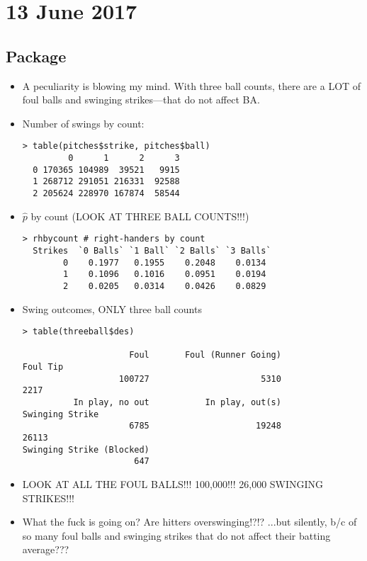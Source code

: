 \documentclass{article}
\begin{document}
\section*{13 June 2017}
\subsection*{Package}
\begin{itemize}
\item A peculiarity is blowing my mind. With three ball counts, there are a LOT of foul balls and swinging strikes---that do not affect BA.
\item Number of swings by count:
\begin{verbatim}
> table(pitches$strike, pitches$ball)
         0      1      2      3
  0 170365 104989  39521   9915
  1 268712 291051 216331  92588
  2 205624 228970 167874  58544
\end{verbatim}
\item $\hat{p}$ by count (LOOK AT THREE BALL COUNTS!!!)
\begin{verbatim}
> rhbycount # right-handers by count
  Strikes  `0 Balls` `1 Ball` `2 Balls` `3 Balls`
        0    0.1977   0.1955    0.2048    0.0134
        1    0.1096   0.1016    0.0951    0.0194
        2    0.0205   0.0314    0.0426    0.0829
\end{verbatim}
\item Swing outcomes, ONLY three ball counts
\begin{verbatim}
> table(threeball$des)

                     Foul       Foul (Runner Going)                  Foul Tip
                   100727                      5310                      2217
          In play, no out           In play, out(s)           Swinging Strike
                     6785                     19248                     26113
Swinging Strike (Blocked)
                      647
\end{verbatim}
\item LOOK AT ALL THE FOUL BALLS!!! 100,000!!! 26,000 SWINGING STRIKES!!!
\item What the fuck is going on? Are hitters overswinging!?!? ...but silently, b/c of so many foul balls and swinging strikes that do not affect their batting average???
\end{itemize}
\end{document}

